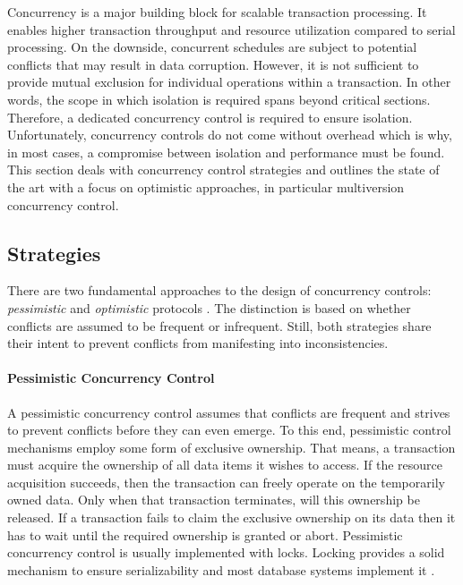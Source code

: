 Concurrency is a major building block for scalable transaction processing. It
enables higher transaction throughput and resource utilization compared to
serial processing. On the downside, concurrent schedules are subject to
potential conflicts that may result in data corruption. However, it is not
sufficient to provide mutual exclusion for individual operations within a
transaction. In other words, the scope in which isolation is required spans
beyond critical sections. Therefore, a dedicated concurrency control is required
to ensure isolation. Unfortunately, concurrency controls do not come without
overhead which is why, in most cases, a compromise between isolation and
performance must be found. This section deals with concurrency control
strategies and outlines the state of the art with a focus on optimistic
approaches, in particular multiversion concurrency control.

\subsection{Strategies}

There are two fundamental approaches to the design of concurrency controls:
\emph{pessimistic} and \emph{optimistic} protocols \cite{kung1981optimistic,
larson2011high, sadoghi2014reducing}. The distinction is based on whether
conflicts are assumed to be frequent or infrequent. Still, both strategies share
their intent to prevent conflicts from manifesting into inconsistencies.

\paragraph{Pessimistic Concurrency Control}

A pessimistic concurrency control assumes that conflicts are frequent and
strives to prevent conflicts before they can even emerge. To this end,
pessimistic control mechanisms employ some form of exclusive ownership. That
means, a transaction must acquire the ownership of all data items it wishes to
access. If the resource acquisition succeeds, then the transaction can freely
operate on the temporarily owned data. Only when that transaction terminates,
will this ownership be released. If a transaction fails to claim the exclusive
ownership on its data then it has to wait until the required ownership is
granted or abort. Pessimistic concurrency control is usually implemented with
locks. Locking provides a solid mechanism to ensure serializability and most
database systems implement it \cite{kung1981optimistic, berenson1995critique,
larson2011high}.

